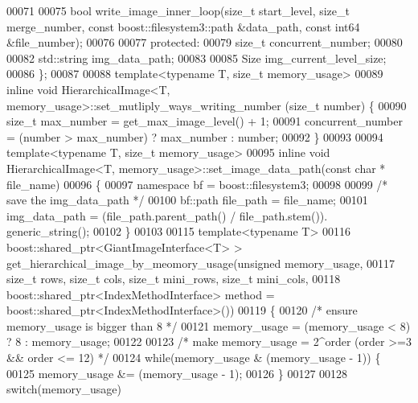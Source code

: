 \begin{DoxyCode}
00071 
00075         \textcolor{keywordtype}{bool} write_image_inner_loop(\textcolor{keywordtype}{size\_t} start\_level, \textcolor{keywordtype}{size\_t} merge\_number, \textcolor{keyword}{
      const} boost::filesystem3::path &data\_path, \textcolor{keyword}{const} int64 &file\_number);
00076 
00077 \textcolor{keyword}{protected}:
00079         \textcolor{keywordtype}{size\_t} concurrent_number;
00080 
00082         std::string img_data_path;
00083 
00085         Size img_current_level_size;
00086 \};
00087 
00088 \textcolor{keyword}{template}<\textcolor{keyword}{typename} T, \textcolor{keywordtype}{size\_t} memory\_usage>
00089 \textcolor{keyword}{inline} \textcolor{keywordtype}{void} HierarchicalImage<T, memory_usage>::set_mutliply_ways_writing_number
      (\textcolor{keywordtype}{size\_t} number) \{
00090         \textcolor{keywordtype}{size\_t} max\_number = get\_max\_image\_level() + 1;
00091         concurrent\_number = (number > max\_number) ? max\_number : number;
00092 \} 
00093 
00094 \textcolor{keyword}{template}<\textcolor{keyword}{typename} T, \textcolor{keywordtype}{size\_t} memory\_usage>
00095 \textcolor{keyword}{inline} \textcolor{keywordtype}{void} HierarchicalImage<T, memory_usage>::set_image_data_path(\textcolor{keyword}{const} \textcolor{keywordtype}{char} 
      * file\_name) 
00096 \{
00097         \textcolor{keyword}{namespace }bf = boost::filesystem3;
00098 
00099         \textcolor{comment}{/* save the img\_data\_path */}
00100         bf::path file\_path = file\_name;
00101         img\_data\_path = (file\_path.parent\_path() / file\_path.stem()).
      generic\_string();
00102 \}
00103 
00115 \textcolor{keyword}{template}<\textcolor{keyword}{typename} T>
00116 boost::shared\_ptr<GiantImageInterface<T> > 
      get_hierarchical_image_by_meomory_usage(\textcolor{keywordtype}{unsigned} memory\_usage,
00117         \textcolor{keywordtype}{size\_t} rows, \textcolor{keywordtype}{size\_t} cols, \textcolor{keywordtype}{size\_t} mini\_rows, \textcolor{keywordtype}{size\_t} mini\_cols,
00118         boost::shared\_ptr<IndexMethodInterface> method = 
      boost::shared\_ptr<IndexMethodInterface>())
00119 \{
00120         \textcolor{comment}{/* ensure memory\_usage is bigger than 8 */}
00121         memory\_usage = (memory\_usage < 8) ? 8 : memory\_usage;
00122 
00123         \textcolor{comment}{/* make memory\_usage = 2^order (order >=3 && order <= 12) */}
00124         \textcolor{keywordflow}{while}(memory\_usage & (memory\_usage - 1)) \{
00125                 memory\_usage &= (memory\_usage - 1);
00126         \}
00127 
00128         \textcolor{keywordflow}{switch}(memory\_usage)

\end{DoxyCode}
